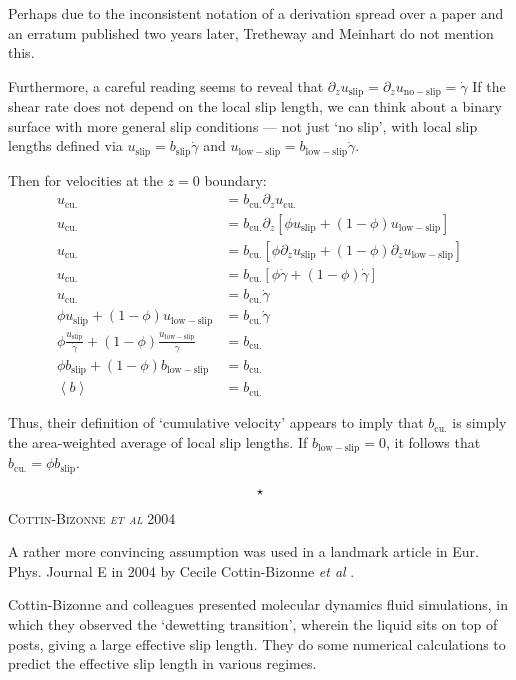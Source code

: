 \documentclass[a4paper]{report}
\newcommand{\sep}{\begin{equation*} \star \end{equation*}}
\newcommand{\paper}[1]
         {\colorbox[gray]{0.8}{ \textsc{#1}}
         
         }
\begin{document}
Perhaps due to the inconsistent notation of a derivation spread over a paper and an erratum published two years later, Tretheway and Meinhart do not mention this.

Furthermore, a careful reading seems to reveal that 
$ \partial_z u_{\mathrm{slip}} = \partial_z u_{\mathrm{no-slip}} = \dot{\gamma} $
If the shear rate does not depend on the local slip length, we can think about a binary surface with more general slip conditions --- not just `no slip', with local slip lengths defined via
$u_{\mathrm{slip}} = b_{\mathrm{slip}} \dot{\gamma}$ and $u_{\mathrm{low-slip}} = b_{\mathrm{low-slip}} \dot{\gamma}$.

Then for velocities at the $z=0$ boundary:
\begin{align*}
u_{\mathrm{cu.}} & = b_{\mathrm{cu.}} \partial_z u_{\mathrm{cu.}} \\
u_{\mathrm{cu.}} & = b_{\mathrm{cu.}} \partial_z
[ \phi u_{\mathrm{slip}} + (1-\phi) u_{\mathrm{low-slip}} ] \\
u_{\mathrm{cu.}} & = b_{\mathrm{cu.}} 
[ \phi \partial_z u_{\mathrm{slip}} + (1-\phi) \partial_z u_{\mathrm{low-slip}} ] \\
u_{\mathrm{cu.}} & = b_{\mathrm{cu.}} [ \phi \dot{\gamma} + (1-\phi) \dot{\gamma} ]\\
u_{\mathrm{cu.}} & = b_{\mathrm{cu.}} \dot{\gamma}\\
\phi u_{\mathrm{slip}} + (1-\phi) u_{\mathrm{low-slip}} & = b_{\mathrm{cu.}} \dot{\gamma} \\
\phi \frac{u_{\mathrm{slip}}}{\dot{\gamma}} + (1-\phi) \frac{ u_{\mathrm{low-slip}}} {\dot{\gamma}} & = b_{\mathrm{cu.}} \\
\phi b_{\mathrm{slip}} + (1-\phi) b_{\mathrm{low-slip}} & = b_{\mathrm{cu.}} \\
\left< b \right> & = b_{\mathrm{cu.}}
\end{align*}

Thus, their definition of `cumulative velocity' appears to imply that $b_{\mathrm{cu.}}$ is simply the area-weighted average of local slip lengths.  If $b_{\mathrm{low-slip}} = 0$, it follows that 
$ b_{\mathrm{cu.}} = \phi b_{\mathrm{slip}} $.

\sep

\paper{Cottin-Bizonne \emph{et al} 2004}
A rather more convincing assumption was used in a landmark article in Eur. Phys. Journal E in 2004 by Cecile Cottin-Bizonne \emph{et al} \cite{Cottin-Bizonne2004}.

Cottin-Bizonne and colleagues presented molecular dynamics fluid simulations, in which they observed the `dewetting transition', wherein the liquid sits on top of posts, giving a large effective slip length.  They do some numerical calculations to predict the effective slip length in various regimes.  
\end{document}
